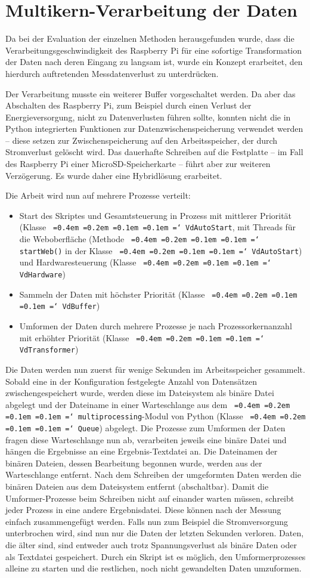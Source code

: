 \documentclass[a4paper,12pt,bibliography=totoc, listof=totoc,titlepage,pointlessnumbers]{scrreprt}
\newcommand*\justify{%
  \fontdimen2\font=0.4em%
  \fontdimen3\font=0.2em%
  \fontdimen4\font=0.1em%
  \fontdimen7\font=0.1em%
  \hyphenchar\font=`\-%
}
\newcommand{\code}[1]{\texttt{\justify{#1}}}
\begin{document}
\section{Multikern-Verarbeitung der Daten}
\label{s:multikern}
Da bei der Evaluation der einzelnen Methoden herausgefunden wurde, dass die Verarbeitungsgeschwindigkeit des Raspberry Pi für eine sofortige Transformation der Daten nach deren Eingang zu langsam ist, wurde ein Konzept erarbeitet, den hierdurch auftretenden Messdatenverlust zu unterdrücken.

Der Verarbeitung musste ein weiterer Buffer vorgeschaltet werden. Da aber das Abschalten des Raspberry Pi, zum Beispiel durch einen Verlust der Energieversorgung, nicht zu Datenverlusten führen sollte, konnten nicht die in Python integrierten Funktionen zur Datenzwischenspeicherung verwendet werden -- diese setzen zur Zwischenspeicherung auf den Arbeitsspeicher, der durch Stromverlust gelöscht wird. Das dauerhafte Schreiben auf die Festplatte -- im Fall des Raspberry Pi einer MicroSD-Speicherkarte -- führt aber zur weiteren Verzögerung. Es wurde daher eine Hybridlösung erarbeitet.

Die Arbeit wird nun auf mehrere Prozesse verteilt:
\begin{itemize}
 \item Start des Skriptes und Gesamtsteuerung in Prozess mit mittlerer Priorität (Klasse \code{VdAutoStart}, mit Threads für die Weboberfläche (Methode \code{startWeb()} in der Klasse \code{VdAutoStart}) und Hardwaresteuerung (Klasse \code{VdHardware})
 \item Sammeln der Daten mit höchster Priorität (Klasse \code{VdBuffer})
 \item Umformen der Daten durch mehrere Prozesse je nach Prozessorkernanzahl mit erhöhter Priorität (Klasse \code{VdTransformer})
\end{itemize}

Die Daten werden nun zuerst für wenige Sekunden im Arbeitsspeicher gesammelt. Sobald eine in der Konfiguration festgelegte Anzahl von Datensätzen zwischengespeichert wurde, werden diese im Dateisystem als binäre Datei abgelegt und der Dateiname in einer Warteschlange aus dem \code{multiprocessing}-Modul von Python (Klasse \code{Queue}) abgelegt. Die Prozesse zum Umformen der Daten fragen diese Warteschlange nun ab, verarbeiten jeweils eine binäre Datei und hängen die Ergebnisse an eine Ergebnis-Textdatei an. Die Dateinamen der binären Dateien, dessen Bearbeitung begonnen wurde, werden aus der Warteschlange entfernt. Nach dem Schreiben der umgeformten Daten werden die binären Dateien aus dem Dateisystem entfernt (abschaltbar). Damit die Umformer-Prozesse beim Schreiben nicht auf einander warten müssen, schreibt jeder Prozess in eine andere Ergebnisdatei. Diese können nach der Messung einfach zusammengefügt werden. Falls nun zum Beispiel die Stromversorgung unterbrochen wird, sind nun nur die Daten der letzten Sekunden verloren. Daten, die älter sind, sind entweder auch trotz Spannungsverlust als binäre Daten oder als Textdatei gespeichert. Durch ein Skript ist es möglich, den Umformerprozesses alleine zu starten und die restlichen, noch nicht gewandelten Daten umzuformen.
\end{document}
